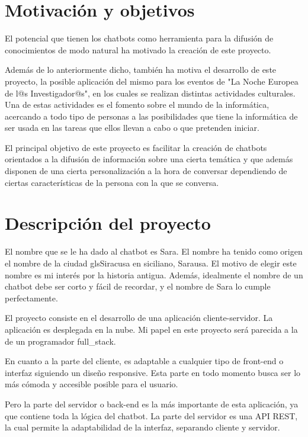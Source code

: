 \section{Motivación y objetivos}

El potencial que tienen los \glspl{chatbot} como herramienta para la difusión de conocimientos de modo natural ha motivado la creación de este proyecto.

Además de lo anteriormente dicho, también ha motiva el desarrollo de este proyecto, la posible aplicación del mismo para los eventos de "La Noche Europea de l@s Investigador@s", en los cuales se realizan distintas actividades culturales. Una de estas actividades es el fomento sobre el mundo de la informática, acercando a todo tipo de personas a las posibilidades que tiene la informática de ser usada en las tareas que ellos llevan a cabo o que pretenden iniciar.

El principal objetivo de este proyecto es facilitar la creación de \glspl{chatbot} orientados a la difusión de información sobre una cierta temática y que además disponen de una cierta personalización a la hora de conversar dependiendo de ciertas características de la persona con la que se conversa.

\section{Descripción del proyecto}

El nombre que se le ha dado al chatbot es Sara. El nombre ha tenido como origen el nombre de la ciudad gls{Siracusa} en siciliano, Sarausa. El motivo de elegir este nombre es mi interés por la historia antigua. Además, idealmente el nombre de un chatbot debe ser corto y fácil de recordar, y el nombre de Sara lo cumple perfectamente.

El proyecto consiste en el desarrollo de una aplicación cliente-servidor. La aplicación es desplegada en la nube. Mi papel en este proyecto será parecida a la de un programador \gls{full_stack}.

En cuanto a la parte del cliente, es adaptable a cualquier tipo de \gls{front-end} o interfaz siguiendo un diseño \gls{responsive}. Esta parte en todo momento busca ser lo más cómoda y accesible posible para el usuario.

Pero la parte del servidor o \gls{back-end} es la más importante de esta aplicación, ya que contiene toda la lógica del \gls{chatbot}. La parte del servidor es una \gls{API REST}, la cual permite la adaptabilidad de la interfaz, separando cliente y servidor.

